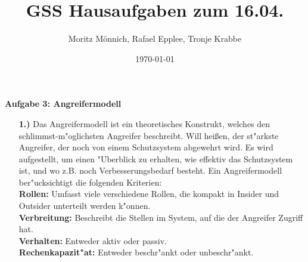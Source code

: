 \documentclass[a4paper,11pt]{scrartcl}
\author{Moritz Mönnich, Rafael Epplee, Tronje Krabbe}
\title{GSS Hausaufgaben zum 16.04.}
\date{\today}
\begin{document}
    \maketitle
    \textbf{Aufgabe 3: Angreifermodell} \\
            \begin{enumerate}
                \item[\textbf{1.)}]
                    Das Angreifermodell ist ein theoretisches Konstrukt, welches den schlimmst-m"oglichsten Angreifer beschreibt.
                    Will heißen, der st"arkste Angreifer, der noch von einem Schutzsystem abgewehrt wird. Es wird aufgestellt,
                    um einen "Uberblick zu erhalten, wie effektiv das Schutzsystem ist, und wo z.B. noch Verbesserungsbedarf besteht.
                    Ein Angreifermodell ber"ucksichtigt die folgenden Kriterien: \\
                    \textbf{Rollen:} Umfasst viele verschiedene Rollen, die kompakt in Insider und Outsider unterteilt werden k"onnen.\\
                    \textbf{Verbreitung:} Beschreibt die Stellen im System, auf die der Angreifer Zugriff hat.\\
                    \textbf{Verhalten:} Entweder aktiv oder passiv.\\
                    \textbf{Rechenkapazit"at:} Entweder beschr"ankt oder unbeschr"ankt.
            \end{enumerate}
\end{document}

